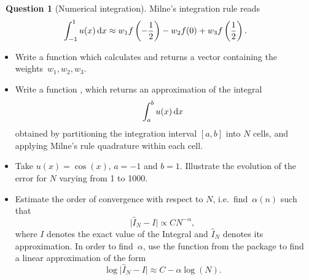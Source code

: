 \documentclass[11pt]{article}
\theoremstyle{definition}
\newtheorem{compexercise}{{\normalfont \faLaptop}~Question}
\begin{document}
\newpage
\begin{compexercise}
    [Numerical integration]
    Milne's integration rule reads
    \[
        \int_{-1}^{1} u(x) \, \mathrm d x
        \approx w_1 f\left(-\frac{1}{2}\right) - w_2 f(0) + w_3 f\left(\frac{1}{2}\right).
    \]
    \begin{itemize}
        \item
            Write a function  which calculates and returns a vector containing the weights~$w_1, w_2, w_3$.

        \item
            Write a function ,
            which returns an approximation of the integral
            \[
                \int_{a}^{b} u(x) \, \mathrm d x
            \]
            obtained by partitioning the integration interval $[a, b]$ into $N$ cells,
            and applying Milne's rule quadrature within each cell.

        \item
            Take $u(x) = \cos(x)$, $a = -1$ and $b = 1$.
            Illustrate the evolution of the error for $N$ varying from 1 to 1000.

        \item
            Estimate the order of convergence with respect to $N$, i.e.\ find~$\alpha(n)$ such that
            \[
                \lvert \widehat I_{N} - I \rvert \propto C N^{-\alpha},
            \]
            where $I$ denotes the exact value of the Integral
            and $\widehat I_{N}$ denotes its approximation.
            In order to find~$\alpha$,
            use the function  from the  package to find a linear approximation
            of the form
            \[
                \log \lvert \widehat I_{N} - I \rvert \approx C - \alpha \log(N).
            \]
    \end{itemize}
\end{compexercise}
\end{document}
